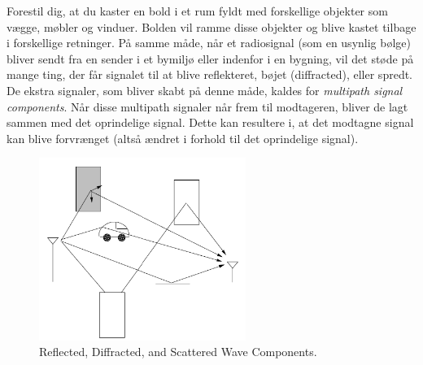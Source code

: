 \documentclass[a4paper,12pt]{book}
\begin{document}
	\noindent Forestil dig, at du kaster en bold i et rum fyldt med forskellige objekter som vægge, møbler og vinduer. Bolden vil ramme disse objekter og blive kastet tilbage i forskellige retninger. På samme måde, når et radiosignal (som en usynlig bølge) bliver sendt fra en sender i et bymiljø eller indenfor i en bygning, vil det støde på mange ting, der får signalet til at blive reflekteret, bøjet (diffracted), eller spredt. De ekstra signaler, som bliver skabt på denne måde, kaldes for \textit{multipath signal components}.
	\newline\newline\noindent
	Når disse multipath signaler når frem til modtageren, bliver de lagt sammen med det oprindelige signal. Dette kan resultere i, at det modtagne signal kan blive forvrænget (altså ændret i forhold til det oprindelige signal). 
	\begin{figure}[h]
		\centering
		\includegraphics[width=0.6\textwidth]{fig/fig3.png}
		\caption{Reflected, Diffracted, and Scattered Wave Components.}
		\label{fig:ray_tracing}
	\end{figure}
	
\end{document}

